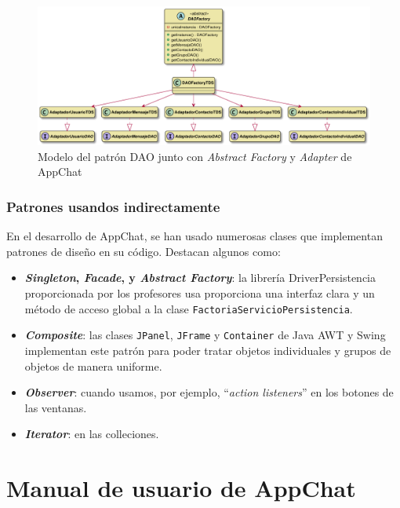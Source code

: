 \documentclass[11pt]{article}
\begin{document}
\begin{figure}[H]
	\centering
	\includegraphics[width=1\linewidth]{figures/abstract_factory.pdf}
	\caption{Modelo del patrón DAO junto con \textit{Abstract Factory} y \textit{Adapter} de AppChat}
	\label{fig:absfactory}
\end{figure}


\subsubsection{Patrones usandos indirectamente}

En el desarrollo de AppChat, se han usado numerosas clases que implementan patrones de diseño en su código. Destacan algunos como:

\begin{itemize}
    \item \textbf{\textit{Singleton}, \textit{Facade}, y \textit{Abstract Factory}}: la librería DriverPersistencia proporcionada por los profesores usa proporciona una interfaz clara y un método de acceso global a la clase \texttt{FactoriaServicioPersistencia}.
    \item \textbf{\textit{Composite}}: las clases \texttt{JPanel}, \texttt{JFrame} y \texttt{Container} de Java AWT y Swing implementan este patrón para poder tratar objetos individuales y grupos de objetos de manera uniforme.
    \item \textbf{\textit{Observer}}: cuando usamos, por ejemplo, ``\textit{action listeners}'' en los botones de las ventanas.
    \item \textbf{\textit{Iterator}}: en las colleciones.
\end{itemize}

\clearpage

\section{Manual de usuario de AppChat}
\end{document}
